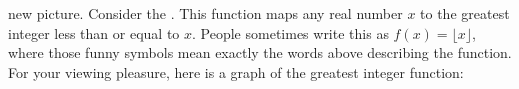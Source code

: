 \documentclass{ximera}
\begin{document}
 

\begin{exercise}
new picture.
Consider the .  This function maps
any real number $x$ to the greatest integer less than or equal to $x$.
People sometimes write this as $f(x) = \lfloor x\rfloor$, where those
funny symbols mean exactly the words above describing the
function. For your viewing pleasure, here is a graph of the greatest
integer function:
\begin{image}
\end{image}
\end{exercise}
\end{document}
